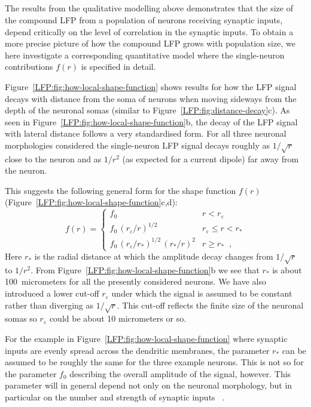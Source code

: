 \subsection{}

The results from the qualitative modelling above demonstrates that the size of the compound LFP 
from a population of neurons receiving synaptic inputs, depend critically on the level of 
correlation in the synaptic inputs. To obtain a more
precise picture of how the compound LFP grows with population size, we here investigate a 
corresponding quantitative model where the single-neuron contributions $f(r)$ is specified in detail.

Figure~\ref{LFP:fig:how-local-shape-function} shows results for how the LFP signal decays with distance from the soma of neurons when moving sideways from the depth of the neuronal somas
(similar to  Figure~\ref{LFP:fig:distance-decay}c). As seen in Figure~\ref{LFP:fig:how-local-shape-function}b, the decay of the LFP signal with lateral distance follows a very standardised form. For all three neuronal morphologies considered the single-neuron LFP signal decays roughly as $1/\sqrt{r}$ close to the neuron and as $1/r^2$ (as expected for a current dipole) far away from the neuron. 

This suggests the following general form for the shape function $f(r)$ 
(Figure~\ref{LFP:fig:how-local-shape-function}c,d):
%
\begin{equation}
  f(r)=
  \begin{cases}
    f_0 & r< r_\varepsilon \\
    f_0\,\left(r_\varepsilon/r\right)^{1/2} &  r_\varepsilon \le r < r_* \\
    f_0\,\left(r_\varepsilon/r_*\right)^{1/2}\,\left(r_*/r\right)^{2}  & r \ge r_* \;\;,
  \end{cases}
\label{LFP:equation:f-power-law}
\end{equation}
%
Here $r_*$ is the radial distance at which the amplitude decay changes from $1/\sqrt{r}$ to $1/r^2$.
From Figure~\ref{LFP:fig:how-local-shape-function}b we see that $r_*$ is about 100~micrometers for all the presently considered neurons. We have also introduced a lower cut-off $r_\varepsilon$ under 
which the signal is assumed to be constant rather than diverging as $1/\sqrt{r}$. This cut-off reflects the finite size of the neuronal somas so $r_\varepsilon$ could be about 10 micrometers or so. 

For the example in Figure~\ref{LFP:fig:how-local-shape-function} where synaptic inputs are evenly spread across the dendritic membranes, the parameter $r_*$ can be assumed to be roughly the same for the three example neurons. This is not so for the parameter $f_0$ describing the overall amplitude of the signal, however. This parameter will in general depend not only on the neuronal morphology, but in particular on the number and strength of synaptic inputs ~\cite{Linden2010,Linden2011,Einevoll2013a}.


